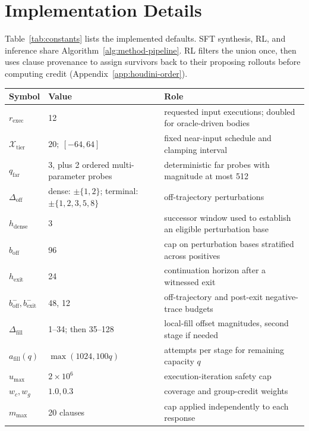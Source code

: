 \section{Implementation Details}
\label{app:constants}

Table~\ref{tab:constants} lists the implemented defaults.  SFT synthesis,
RL, and inference share Algorithm~\ref{alg:method-pipeline}.  RL filters the
union once, then uses clause provenance to assign survivors back to their
proposing rollouts before computing credit
(Appendix~\ref{app:houdini-order}).

\begin{table}[H]
\centering
\begin{tabular}{p{2.6cm}p{3.1cm}p{5.9cm}}
\toprule
\rowcolor{algobg}
\textbf{Symbol} & \textbf{Value} & \textbf{Role} \\
\midrule
\(r_{\mathrm{exec}}\) & 12 & requested input executions; doubled for oracle-driven bodies \\
\(\mathcal X_{\mathrm{tier}}\) & \(20;\ [-64,64]\) & fixed near-input schedule and clamping interval \\
\(q_{\mathrm{far}}\) & 3, plus 2 ordered multi-parameter probes & deterministic far probes with magnitude at most 512 \\
\(\Delta_{\mathrm{off}}\) & dense: \(\pm\{1,2\}\); terminal: \(\pm\{1,2,3,5,8\}\) & off-trajectory perturbations \\
\(h_{\mathrm{dense}}\) & 3 & successor window used to establish an eligible perturbation base \\
\(b_{\mathrm{off}}\) & 96 & cap on perturbation bases stratified across positives \\
\(h_{\mathrm{exit}}\) & 24 & continuation horizon after a witnessed exit \\
\(b^-_{\mathrm{off}},b^-_{\mathrm{exit}}\) & 48, 12 & off-trajectory and post-exit negative-trace budgets \\
\(\Delta_{\mathrm{fill}}\) & 1--34; then 35--128 & local-fill offset magnitudes, second stage if needed \\
\(a_{\mathrm{fill}}(q)\) & \(\max(1024,100q)\) & attempts per stage for remaining capacity \(q\) \\
\(u_{\max}\) & \(2\times10^6\) & execution-iteration safety cap \\
\midrule
\(w_c,w_g\) & \(1.0,0.3\) & coverage and group-credit weights \\
\(m_{\max}\) & 20 clauses & cap applied independently to each response \\

\end{tabular}
\end{table}
